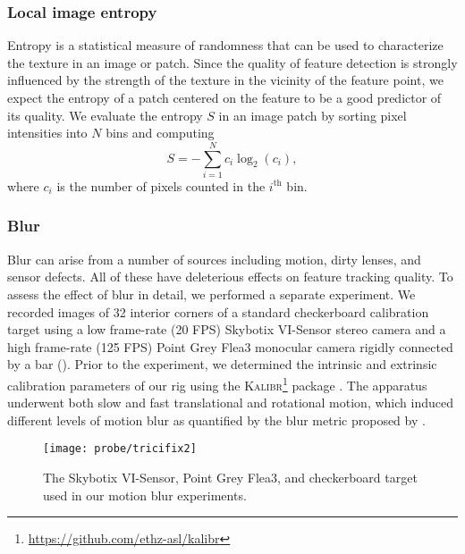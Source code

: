 \subsubsection{Local image entropy}
Entropy is a statistical measure of randomness that can be used to characterize the texture in an image or patch.
Since the quality of feature detection is strongly influenced by the strength of the texture in the vicinity of the feature point, we expect the entropy of a patch centered on the feature to be a good predictor of its quality.
We evaluate the entropy $S$ in an image patch by sorting pixel intensities into $N$ bins and computing
\begin{equation}
    S = -\sum_{i=1}^N c_i \log_2(c_i),
\end{equation}
where $c_i$ is the number of pixels counted in the $i^\text{th}$ bin.


\subsubsection{Blur}
Blur can arise from a number of sources including motion, dirty lenses, and sensor defects.
All of these have deleterious effects on feature tracking quality.
To assess the effect of blur in detail, we performed a separate experiment.
We recorded images of 32 interior corners of a standard checkerboard calibration target using a low frame-rate (20 FPS) Skybotix VI-Sensor stereo camera and a high frame-rate (125 FPS) Point Grey Flea3 monocular camera rigidly connected by a bar ().
Prior to the experiment, we determined the intrinsic and extrinsic calibration parameters of our rig using the \textsc{Kalibr}\footnote{\url{https://github.com/ethz-asl/kalibr}} package \cite{Furgale2013-sl}.
The apparatus underwent both slow and fast translational and rotational motion, which induced different levels of motion blur as quantified by the blur metric proposed by \cite{crete2007blur}.

\begin{figure}
    \centering
    \texttt{[image: probe/tricifix2]}
    \caption{The Skybotix VI-Sensor, Point Grey Flea3, and checkerboard target used in our motion blur experiments.}
    \label{fig:probe_tricifix}
\end{figure}



